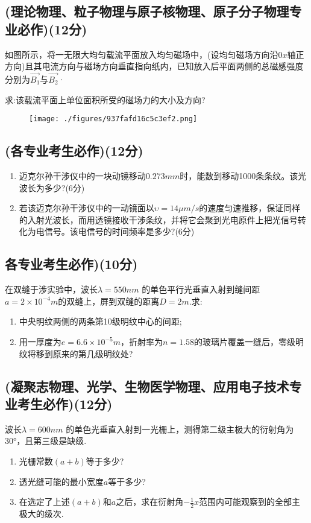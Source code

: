 \subsection{(理论物理、粒子物理与原子核物理、原子分子物理专业必作)(12分)}
如图所示，将一无限大均匀载流平面放入均匀磁场中，(设均匀磁场方向沿$0x$轴正方向)且其电流方向与磁场方向垂直指向纸内，已知放入后平面两侧的总磁感强度分别为$\vec{B_1}$与$\vec{B_2}$·

求:该载流平面上单位面积所受的磁场力的大小及方向?
\begin{figure}[ht]
\centering
\texttt{[image: ./figures/937fafd16c5c3ef2.png]}
\caption{} \label{fig_CD07_2}
\end{figure}
\subsection{(各专业考生必作)(12分)}
\begin{enumerate}
\item 迈克尔孙干涉仪中的一块动镜移动$0.273mm$时，能数到移动1000条条纹。该光波长为多少?(6分)
\item 若该迈克尔孙干涉仪中的一动镜面以$\upsilon=14\mu m/s$的速度匀速推移，保证同样的入射光波长，而用透镜接收干涉条纹，并将它会聚到光电原件上把光信号转化为电信号。该电信号的时间频率是多少?(6分)
\end{enumerate}
\subsection{各专业考生必作)(10分)}
在双缝于涉实验中，波长$\lambda=550nm$ 的单色平行光垂直入射到缝间距$a=2\times10^{-4}m$的双缝上，屏到双缝的距离$D=2m$.求:
\begin{enumerate}
\item 中央明纹两侧的两条第10级明纹中心的间距;
\item 用一厚度为$e=6.6\times10^{-5}m$，折射率为$n=1.58$的玻璃片覆盖一缝后，零级明纹将移到原来的第几级明纹处?
\end{enumerate}
\subsection{(凝聚志物理、光学、生物医学物理、应用电子技术专业考生必作)(12分)}
波长$\lambda=600nm$ 的单色光垂直入射到一光栅上，测得第二级主极大的衍射角为 30°，且第三级是缺级.
\begin{enumerate}
\item 光栅常数$(a+b)$等于多少?
\item 透光缝可能的最小宽度$a$等于多少?
\item 在选定了上述$(a+b)$和$a$之后，求在衍射角$-\frac{1}{2}x$范围内可能观察到的全部主极大的级次.
\end{enumerate}